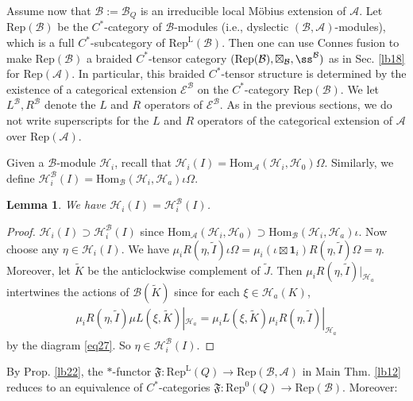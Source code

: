 \documentclass[11pt,b5paper,notitlepage]{article}
\theoremstyle{definition}
\theoremstyle{plain}
\newtheorem{lm}[df]{Lemma}
\newcommand{\fk}{\mathfrak}
\newcommand{\mc}{\mathcal}
\newcommand{\wtd}{\widetilde}
\newcommand{\id}{\mathbf{1}}
\newcommand{\Hom}{\mathrm{Hom}}
\newcommand{\Rep}{\mathrm{Rep}}
\newcommand{\scr}{\mathscr}
\newcommand{\RepA}{\mathrm{Rep}(\mathcal A)}
\newcommand{\RepL}{\mathrm{Rep}^{\mathrm{L}}}
\numberwithin{equation}{section}
\begin{document}
Assume now that $\mc B:=\mc B_Q$ is an irreducible local M\"obius extension of $\mc A$. Let $\Rep(\mc B)$ be the $C^*$-category of $\mc B$-modules (i.e., dyslectic $(\mc B,\mc A)$-modules), which is a full $C^*$-subcategory of $\RepL(\mc B)$. Then one can use Connes fusion to make $\Rep(\mc B)$ a braided $C^*$-tensor category $(\Rep(\mc B),\boxtimes_{\mc B},\ss^{\mc B})$  as in Sec. \ref{lb18} for $\RepA$. In particular, this braided $C^*$-tensor structure is determined by the existence of a categorical extension $\scr E^{\mc B}$ on the $C^*$-category $\Rep(\mc B)$. We let $L^{\mc B},R^{\mc B}$ denote the $L$ and $R$ operators of $\scr E^{\mc B}$. As in the previous sections, we do not write superscripts for the $L$ and $R$ operators of the categorical extension of $\mc A$ over $\RepA$.

Given a $\mc B$-module $\mc H_i$, recall that $\mc H_i(I)=\Hom_{\mc A}(\mc H_i,\mc H_0)\Omega$. Similarly, we define $\mc H_i^{\mc B}(I)=\Hom_{\mc B}(\mc H_i,\mc H_a)\iota\Omega$.
\begin{lm}
We have $\mc H_i(I)=\mc H_i^{\mc B}(I)$.
\end{lm}
\begin{proof}
$\mc H_i(I)\supset\mc H_i^{\mc B}(I)$ since $\Hom_{\mc A}(\mc H_i,\mc H_0)\supset\Hom_{\mc B}(\mc H_i,\mc H_a)\iota$. Now choose any $\eta\in\mc H_i(I)$. We have $\mu_i R(\eta,\wtd I)\iota\Omega=\mu_i(\iota\boxtimes\id_i)R(\eta,\wtd I)\Omega=\eta$. Moreover, let $\wtd K$ be the anticlockwise complement of $\wtd J$. Then $\mu_i R(\eta,\wtd I)|_{\mc H_a}$ intertwines the actions of $\mc B(\wtd K)$ since for each $\xi\in\mc H_a(K)$, 
\begin{align*}
	\mu_i R(\eta,\wtd I)\mu L(\xi,\wtd K)|_{\mc H_a}=\mu_i L(\xi,\wtd K)\mu_i R(\eta,\wtd I)|_{\mc H_a}	
\end{align*}
by the diagram \eqref{eq27}. So $\eta\in \mc H_i^{\mc B}(I)$.
\end{proof}






By Prop. \ref{lb22}, the $*$-functor $\fk F:\RepL(Q)\rightarrow\Rep(\mc B,\mc A)$ in Main Thm. \ref{lb12} reduces to an equivalence of $C^*$-categories $\fk F:\Rep^0(Q)\rightarrow\Rep(\mc B)$. Moreover:
\end{document}

